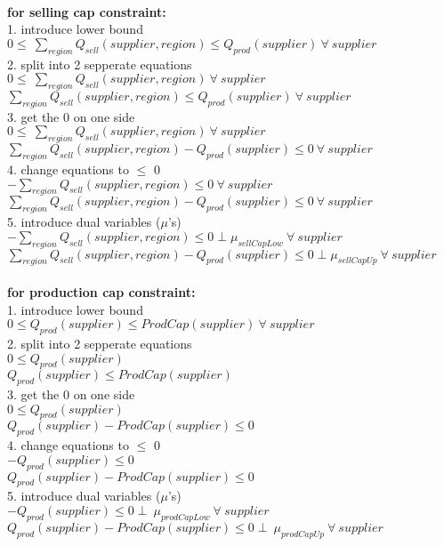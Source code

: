 \documentclass{article}
\begin{document}
\hfill\\
\textbf{for	selling cap constraint: }\\
1. introduce lower bound\\
\quad	$0 \leq\ \sum_{region} Q_{sell}(supplier, region)  \leq Q_{prod}(supplier) \: \forall \: supplier$\\
2. split into 2 sepperate equations\\
\quad$0 \leq\ \sum_{region} Q_{sell}(supplier, region) \: \forall \: supplier $\\
\quad$\sum_{region} Q_{sell}(supplier, region) \leq Q_{prod}(supplier) \: \forall \: supplier$\\
3. get the 0 on one side\\
\quad$0 \leq\ \sum_{region} Q_{sell}(supplier, region) \: \forall \: supplier $\\
\quad$\sum_{region} Q_{sell}(supplier, region) - Q_{prod}(supplier) \leq 0\: \forall \: supplier$\\
4. change equations to $\leq$ 0\\
\quad$ -\sum_{region} Q_{sell}(supplier, region) \leq 0 \: \forall \: supplier $\\
\quad$\sum_{region} Q_{sell}(supplier, region) - Q_{prod}(supplier) \leq 0\: \forall \: supplier$\\
5. introduce dual variables ($\mu$'s)\\
\quad$ -\sum_{region} Q_{sell}(supplier, region) \leq 0 \perp \mu_{sellCapLow} \: \forall \: supplier $\\
\quad$\sum_{region} Q_{sell}(supplier, region) - Q_{prod}(supplier) \leq 0  \perp \mu_{sellCapUp}\: \forall \: supplier$\\


\hfill\\
\textbf{for	production cap constraint: }\\
1. introduce lower bound\\
\quad$0 \leq Q_{prod}(supplier) \leq ProdCap(supplier) \: \forall \: supplier$\\  
2. split into 2 sepperate equations\\
\quad$0 \leq Q_{prod}(supplier) $\\  
\quad$Q_{prod}(supplier) \leq ProdCap(supplier)$\\
3. get the 0 on one side\\
\quad$0 \leq Q_{prod}(supplier) $\\  
\quad$Q_{prod}(supplier) - ProdCap(supplier)\leq 0$\\
4. change equations to $\leq$ 0\\
\quad$- Q_{prod}(supplier) \leq 0 $\\  
\quad$Q_{prod}(supplier) - ProdCap(supplier)\leq 0$\\
5. introduce dual variables ($\mu$'s)\\
\quad$- Q_{prod}(supplier) \leq 0 \perp\: \mu_{prodCapLow} \: \forall \: supplier$\\
\quad$Q_{prod}(supplier) -ProdCap(supplier) \leq 0 \perp\: \mu_{prodCapUp} \: \forall \: supplier$\\
\end{document}
